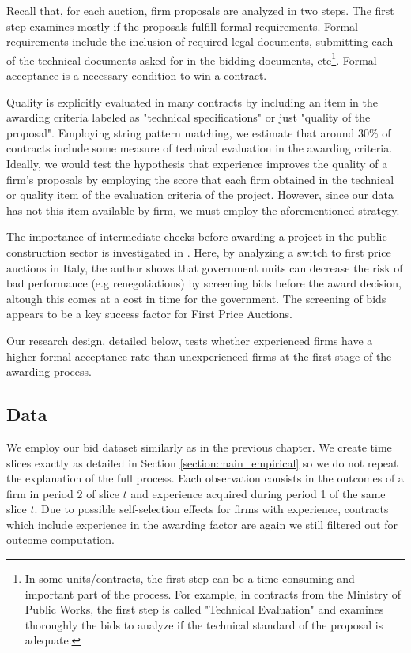 Recall that, for each auction, firm proposals are analyzed in two steps. The first step examines mostly if the proposals fulfill formal requirements. Formal requirements include the inclusion of required legal documents, submitting each of the technical documents asked for in the bidding documents, etc\footnote{In some units/contracts, the first step can be a time-consuming and important part of the process. For example, in contracts from the Ministry of Public Works, the first step is called "Technical Evaluation" and examines thoroughly the bids to analyze if the technical standard of the proposal is adequate.}. Formal acceptance is a necessary condition to win a contract.

Quality is explicitly evaluated in many contracts by including an item in the awarding criteria labeled as "technical specifications" or just "quality of the proposal". Employing string pattern matching, we estimate that around 30\% of contracts include some measure of technical evaluation in the awarding criteria.  Ideally, we would test the hypothesis that experience improves the quality of a firm's proposals by employing the score that each firm obtained in the technical or quality item of the evaluation criteria of the project. However, since our data has not this item available by firm, we must employ the aforementioned strategy.

The importance of intermediate checks before awarding a project in the public construction sector is investigated in \citep{decarolis2014awarding}. Here, by analyzing a switch to first price auctions in Italy, the author shows that government units can decrease the risk of bad performance (e.g renegotiations) by screening bids before the award decision, altough this comes at a cost in time for the government. The screening of bids appears to be a key success factor for First Price Auctions.

Our research design, detailed below, tests whether experienced firms have a higher formal acceptance rate than unexperienced firms at the first stage of the awarding process.

\subsection{Data}
We employ our bid dataset similarly as in the previous chapter. We create time slices exactly as detailed in Section \ref{section:main_empirical} so we do not repeat the explanation of the full process.  Each observation consists in the outcomes of a firm in period 2 of slice $t$ and experience acquired during period 1 of the same slice $t$. Due to possible self-selection effects for firms with experience, contracts which include experience in the awarding factor are again we still filtered out for outcome computation.

